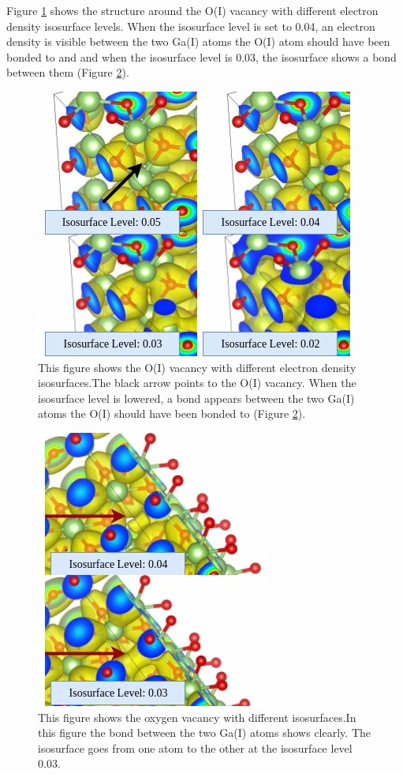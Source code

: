 Figure \ref{fig:isosurface_O_I} shows the structure around the O(I) vacancy with different electron density isosurface levels. When the isosurface level is set to 0.04, an electron density is visible between the two Ga(I) atoms the O(I) atom should have been bonded to and and when the isosurface level is 0.03, the isosurface shows a bond between them (Figure \ref{fig:bond_O_I}).

\begin{figure}[H]
\includegraphics[width=0.9\linewidth]{../fig/isosurfaces/O_I/isosurface}\caption{This figure shows the O(I) vacancy with different electron density isosurfaces.The black arrow points to the O(I) vacancy. When the isosurface level is lowered, a bond appears between the two Ga(I) atoms the O(I) should have been bonded to (Figure \ref{fig:bond_O_I}).}\label{fig:isosurface_O_I}
\end{figure}

\begin{figure}[H]
\includegraphics[width=0.7\linewidth]{../fig/isosurfaces/O_I/bond}\caption{This figure shows the oxygen vacancy with different isosurfaces.In this figure the bond between the two Ga(I) atoms shows clearly. The isosurface goes from one atom to the other at the isosurface level 0.03.}\label{fig:bond_O_I}
\end{figure}

